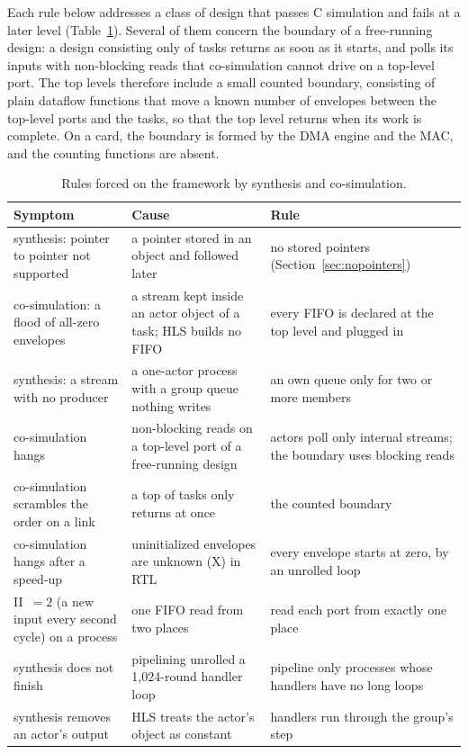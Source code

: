 \documentclass[11pt]{article}
\begin{document}
Each rule below addresses a class of design that passes C simulation and fails
at a later level (Table~\ref{tab:rules}). Several of them concern the
boundary of a free-running design: a design consisting only of tasks returns as
soon as it starts, and polls its inputs with non-blocking reads that
co-simulation cannot drive on a top-level port. The top levels therefore
include a small counted boundary, consisting of plain dataflow functions that
move a known number of envelopes between the top-level ports and the tasks, so
that the top level returns when its work is complete. On a card, the boundary
is formed by the DMA engine and the MAC, and the counting functions are
absent.

\begin{table}[h]
\centering
\caption{Rules forced on the framework by synthesis and co-simulation.}
\label{tab:rules}
\small
\begin{tabular}{p{4.6cm} p{4.4cm} p{4.4cm}}
\toprule
Symptom & Cause & Rule \\
\midrule
synthesis: pointer to pointer not supported & a pointer stored in an object and followed later & no stored pointers (Section~\ref{sec:nopointers}) \\
co-simulation: a flood of all-zero envelopes & a stream kept inside an actor object of a task; HLS builds no FIFO & every FIFO is declared at the top level and plugged in \\
synthesis: a stream with no producer & a one-actor process with a group queue nothing writes & an own queue only for two or more members \\
co-simulation hangs & non-blocking reads on a top-level port of a free-running design & actors poll only internal streams; the boundary uses blocking reads \\
co-simulation scrambles the order on a link & a top of tasks only returns at once & the counted boundary \\
co-simulation hangs after a speed-up & uninitialized envelopes are unknown (X) in RTL & every envelope starts at zero, by an unrolled loop \\
II~$=2$ (a new input every second cycle) on a process & one FIFO read from two places & read each port from exactly one place \\
synthesis does not finish & pipelining unrolled a 1{,}024-round handler loop & pipeline only processes whose handlers have no long loops \\
synthesis removes an actor's output & HLS treats the actor's object as constant & handlers run through the group's step \\
\bottomrule
\end{tabular}
\end{table}
\end{document}
